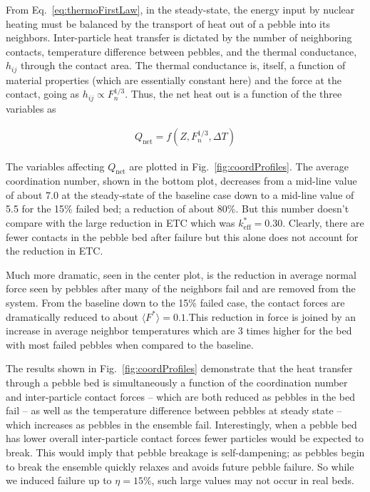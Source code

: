 From Eq.~\ref{eq:thermoFirstLaw}, in the steady-state, the energy input by nuclear heating must be balanced by the transport of heat out of a pebble into its neighbors. Inter-particle heat transfer is dictated by the number of neighboring contacts, temperature difference between pebbles, and the thermal conductance, $h_{ij}$ through the contact area. The thermal conductance is, itself, a function of material properties  (which are essentially constant here) and the force at the contact, going as $h_{ij} \propto F_n^{1/3}$. Thus, the net heat out is a function of the three variables as

\begin{align}
	Q_\text{net} =f( Z, F_n^{1/3}, \Delta T)
\end{align}



The variables affecting $Q_\text{net}$ are plotted in Fig.~\ref{fig:coordProfiles}. The average coordination number, shown in the bottom plot, decreases from a mid-line value of about 7.0 at the steady-state of the baseline case down to a mid-line value of 5.5 for the 15\% failed bed; a reduction of about 80\%. But this number doesn't compare with the large reduction in ETC which was $k_\text{eff}^*=0.30$. Clearly, there are fewer contacts in the pebble bed after failure but this alone does not account for the reduction in ETC.

Much more dramatic, seen in the center plot, is the reduction in average normal force seen by pebbles after many of the neighbors fail and are removed from the system. From the baseline down to the 15\% failed case, the contact forces are dramatically reduced to about $\langle F^* \rangle=0.1$.This reduction in force is joined by an increase in average neighbor temperatures which are 3 times higher for the bed with most failed pebbles when compared to the baseline. 

The results shown in Fig.~\ref{fig:coordProfiles} demonstrate that the heat transfer through a pebble bed is simultaneously a function of the coordination number and inter-particle contact forces -- which are both reduced as pebbles in the bed fail -- as well as the temperature difference between pebbles at steady state -- which increases as pebbles in the ensemble fail. Interestingly, when a pebble bed has lower overall inter-particle contact forces fewer particles would be expected to break. This would imply that pebble breakage is self-dampening; as pebbles begin to break the ensemble quickly relaxes and avoids future pebble failure. So while we induced failure up to $\eta = 15\%$, such large values may not occur in real beds. 

